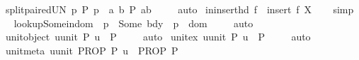 \begin{isabellebody}
\ split{\isacharunderscore}paired{\isacharunderscore}UN{\isacharcolon}\ {\isachardoublequoteopen}{\isacharparenleft}{\isasymUnion}p{\isachardot}\ {\isacharparenleft}P\ p{\isacharparenright}{\isacharparenright}\ {\isacharequal}\ {\isacharparenleft}{\isasymUnion}a\ b{\isachardot}\ {\isacharparenleft}P\ {\isacharparenleft}a{\isacharcomma}b{\isacharparenright}{\isacharparenright}{\isacharparenright}{\isachardoublequoteclose}\ \isanewline
%
\isadelimproof
\ \ %
\endisadelimproof
%
\isatagproof
{}\isamarkupfalse%
\ auto%
\endisatagproof
{\isafoldproof}%
%
\isadelimproof
\isanewline
%
\endisadelimproof
\isanewline
{}\isamarkupfalse%
\ in{\isacharunderscore}insert{\isacharunderscore}hd{\isacharcolon}\ {\isachardoublequoteopen}f\ {\isasymin}\ insert\ f\ X{\isachardoublequoteclose}\isanewline
%
\isadelimproof
\ \ %
\endisadelimproof
%
\isatagproof
{}\isamarkupfalse%
\ simp%
\endisatagproof
{\isafoldproof}%
%
\isadelimproof
\isanewline
%
\endisadelimproof
\ \isanewline
{}\isamarkupfalse%
\ lookup{\isacharunderscore}Some{\isacharunderscore}in{\isacharunderscore}dom{\isacharcolon}\ {\isachardoublequoteopen}{\isasymGamma}\ p\ {\isacharequal}\ Some\ bdy\ {\isasymLongrightarrow}\ p\ {\isasymin}\ dom\ {\isasymGamma}{\isachardoublequoteclose}\isanewline
%
\isadelimproof
\ \ %
\endisadelimproof
%
\isatagproof
{}\isamarkupfalse%
\ auto%
\endisatagproof
{\isafoldproof}%
%
\isadelimproof
\isanewline
%
\endisadelimproof
\isanewline
{}\isamarkupfalse%
\ unit{\isacharunderscore}object{\isacharcolon}\ {\isachardoublequoteopen}{\isacharparenleft}{\isasymforall}u{\isacharcolon}{\isacharcolon}unit{\isachardot}\ P\ u{\isacharparenright}\ {\isacharequal}\ P\ {\isacharparenleft}{\isacharparenright}{\isachardoublequoteclose}\isanewline
%
\isadelimproof
\ \ %
\endisadelimproof
%
\isatagproof
{}\isamarkupfalse%
\ auto%
\endisatagproof
{\isafoldproof}%
%
\isadelimproof
\isanewline
%
\endisadelimproof
\isanewline
{}\isamarkupfalse%
\ unit{\isacharunderscore}ex{\isacharcolon}\ {\isachardoublequoteopen}{\isacharparenleft}{\isasymexists}u{\isacharcolon}{\isacharcolon}unit{\isachardot}\ P\ u{\isacharparenright}\ {\isacharequal}\ P\ {\isacharparenleft}{\isacharparenright}{\isachardoublequoteclose}\isanewline
%
\isadelimproof
\ \ %
\endisadelimproof
%
\isatagproof
{}\isamarkupfalse%
\ auto%
\endisatagproof
{\isafoldproof}%
%
\isadelimproof
\isanewline
%
\endisadelimproof
\isanewline
{}\isamarkupfalse%
\ unit{\isacharunderscore}meta{\isacharcolon}\ {\isachardoublequoteopen}{\isacharparenleft}{\isasymAnd}{\isacharparenleft}u{\isacharcolon}{\isacharcolon}unit{\isacharparenright}{\isachardot}\ PROP\ P\ u{\isacharparenright}\ {\isasymequiv}\ PROP\ P\ {\isacharparenleft}{\isacharparenright}{\isachardoublequoteclose}\isanewline

\end{isabellebody}
